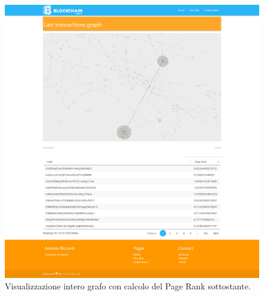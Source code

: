 \begin{figure}[H]
	\centering
	\includegraphics[width=\textwidth, height=0.80\textheight]{images/pageRankView.png}
	\caption{Visualizzazione intero grafo con calcolo del Page Rank sottostante.}
	\label{fig:graphPageBE}
\end{figure}